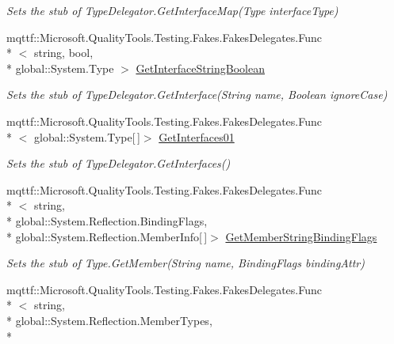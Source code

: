 \begin{DoxyCompactItemize}
\begin{DoxyCompactList}\small\item\em Sets the stub of Type\-Delegator.\-Get\-Interface\-Map(\-Type interface\-Type)\end{DoxyCompactList}\item 
mqttf\-::\-Microsoft.\-Quality\-Tools.\-Testing.\-Fakes.\-Fakes\-Delegates.\-Func\\*
$<$ string, bool, \\*
global\-::\-System.\-Type $>$ \hyperlink{class_system_1_1_reflection_1_1_fakes_1_1_stub_type_delegator_a4b055a1b66e7cc6c92b1cd3b7c760dec}{Get\-Interface\-String\-Boolean}
\begin{DoxyCompactList}\small\item\em Sets the stub of Type\-Delegator.\-Get\-Interface(\-String name, Boolean ignore\-Case)\end{DoxyCompactList}\item 
mqttf\-::\-Microsoft.\-Quality\-Tools.\-Testing.\-Fakes.\-Fakes\-Delegates.\-Func\\*
$<$ global\-::\-System.\-Type\mbox{[}$\,$\mbox{]}$>$ \hyperlink{class_system_1_1_reflection_1_1_fakes_1_1_stub_type_delegator_aa27921bffedede35c29e603ac2b08785}{Get\-Interfaces01}
\begin{DoxyCompactList}\small\item\em Sets the stub of Type\-Delegator.\-Get\-Interfaces()\end{DoxyCompactList}\item 
mqttf\-::\-Microsoft.\-Quality\-Tools.\-Testing.\-Fakes.\-Fakes\-Delegates.\-Func\\*
$<$ string, \\*
global\-::\-System.\-Reflection.\-Binding\-Flags, \\*
global\-::\-System.\-Reflection.\-Member\-Info\mbox{[}$\,$\mbox{]}$>$ \hyperlink{class_system_1_1_reflection_1_1_fakes_1_1_stub_type_delegator_a84779be94e65813ddc32197e79cfb10f}{Get\-Member\-String\-Binding\-Flags}
\begin{DoxyCompactList}\small\item\em Sets the stub of Type.\-Get\-Member(\-String name, Binding\-Flags binding\-Attr)\end{DoxyCompactList}\item 
mqttf\-::\-Microsoft.\-Quality\-Tools.\-Testing.\-Fakes.\-Fakes\-Delegates.\-Func\\*
$<$ string, \\*
global\-::\-System.\-Reflection.\-Member\-Types, \\*

\end{DoxyCompactItemize}
